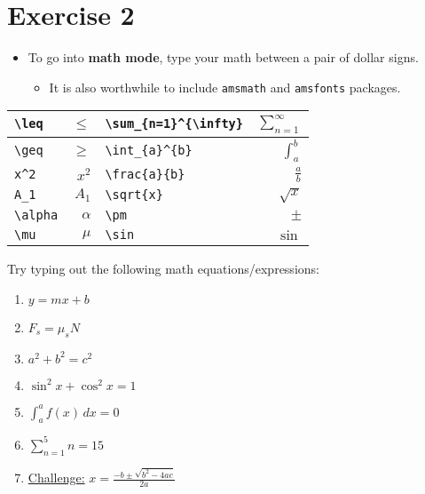 \documentclass{article}
\begin{document}
    \section*{Exercise 2}
    \begin{mdframed}
        \begin{itemize}
            \item To go into \textbf{math mode}, type your math between a pair
                of dollar signs.
                \begin{itemize}
                    \item It is also worthwhile to include \verb|amsmath| and
                        \verb|amsfonts| packages.
                \end{itemize}
        \end{itemize}
        \begin{center}
            \begingroup
            \setlength{\tabcolsep}{8pt}
            \renewcommand{\arraystretch}{1.5}
                \begin{tabular}{| l | r | l | r |}
                    \hline
                    \verb|\leq|   & $\leq$   & \verb|\sum_{n=1}^{\infty}| & $\sum_{n=1}^{\infty}$ \\\hline
                    \verb|\geq|   & $\geq$   & \verb|\int_{a}^{b}|        & $\int_{a}^{b}$        \\\hline
                    \verb|x^2|    & $x^2$    & \verb|\frac{a}{b}|         & $\frac{a}{b}$         \\\hline
                    \verb|A_1|    & $A_1$    & \verb|\sqrt{x}|            & $\sqrt{x}$            \\\hline
                    \verb|\alpha| & $\alpha$ & \verb|\pm|                 & $\pm$                 \\\hline
                    \verb|\mu|    & $\mu$    & \verb|\sin|                & $\sin$                \\\hline
                \end{tabular}
            \endgroup
        \end{center}
    \end{mdframed}
    \begin{mdframed}
        Try typing out the following math equations/expressions:
        \begin{enumerate}[1)]
            \item $y = mx + b$
            \item $F_s = \mu_s N$
            \item $a^2 + b^2 = c^2$
            \item $\sin^2 x + \cos^2 x = 1$
            \item $\int_a^a f(x)\,dx = 0$
            \item $\sum_{n=1}^5 n = 15$
            \item \underline{Challenge:} $x = \frac{-b \pm \sqrt{b^2 -
                4ac}}{2a}$
        \end{enumerate}
    \end{mdframed}
\end{document}
